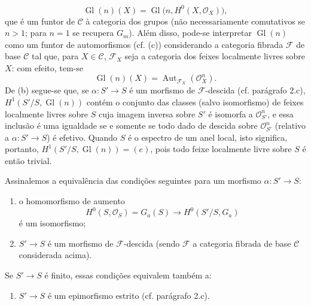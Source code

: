 \[
  \operatorname{Gl}(n)(X)=
  \operatorname{Gl}\bigl(n,H^0(X,\mathcal O_X)\bigr),
\]
que é um funtor de $\mathcal C$ à categoria dos grupos (não
necessariamente comutativos se $n>1$; para $n=1$ se recupera $G_m$). Além disso,
pode-se interpretar $\operatorname{Gl}(n)$ como um funtor de automorfismos
(cf. (c)) considerando a categoria fibrada $\mathcal F$ de base $\mathcal C$
tal que, para $X\in\mathcal C$, $\mathcal F_X$ seja a categoria dos feixes
localmente livres sobre $X$: com efeito, tem-se
\[
  \operatorname{Gl}(n)(X)=
  \operatorname{Aut}_{\mathcal F_X}(\mathcal O_X^n).
\]
De (b) segue-se que, se $\alpha:S'\longrightarrow S$ é um morfismo de
$\mathcal F$-descida (cf. parágrafo 2.c),
$H^1(S'/S,\operatorname{Gl}(n))$ contém o conjunto das classes (salvo
isomorfismo) de feixes localmente livres sobre $S$ cuja imagem inversa sobre
$S'$ é isomorfa a $\mathcal O_{S'}^n$, e essa inclusão é uma igualdade se e
somente se todo dado de descida sobre $\mathcal O_{S'}^n$ (relativo a
$\alpha:S'\longrightarrow S$) é efetivo. Quando $S$ é o espectro de um
anel local, isto significa, portanto,
$H^1(S'/S,\operatorname{Gl}(n))=(e)$, pois todo feixe localmente livre sobre $S$
é então trivial.

Assinalemos a equivalência das condições seguintes para um morfismo
$\alpha:S'\longrightarrow S$:
\begin{enumerate}
\item[(i)] o homomorfismo de aumento
\[
  H^0(S,\mathcal O_S)=G_a(S)\longrightarrow H^0(S'/S,G_a)
\]
é um isomorfismo;
\item[(ii)] $S'\longrightarrow S$ é um morfismo de $\mathcal F$-descida
(sendo $\mathcal F$ a categoria fibrada de base $\mathcal C$ considerada
acima).
\end{enumerate}
Se $S'\longrightarrow S$ é finito, essas condições equivalem também a:
\begin{enumerate}
\item[(iii)] $S'\longrightarrow S$ é um epimorfismo estrito
(cf. parágrafo 2.c).
\end{enumerate}

